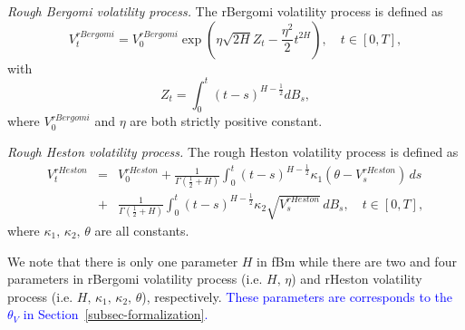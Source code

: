 \documentclass[]{article}
\renewcommand{\(}{\left(}
\renewcommand{\)}{\right)}
\begin{document}
	\textit{Rough Bergomi volatility process.} The rBergomi volatility process is defined as
	\begin{equation}
		\label{eq-rBergomi}
		V_t^{rBergomi} = V_0^{rBergomi} \exp \left(\eta\sqrt{2H}Z_t - \frac{\eta^2}{2} t^{2H}\right),\quad t\in[0,T],
	\end{equation}
	with
	\begin{equation}
		\label{eq-fBm2}
		Z_t = \int_{0}^{t} (t-s)^{H-\frac{1}{2}} dB_s,
	\end{equation}
	where $V_0^{rBergomi}$ and $\eta$ are both strictly positive constant.
	
	\textit{Rough Heston volatility process.} The rough Heston volatility process is defined as
	\begin{eqnarray}
		\label{eq-rHeston}
		V_t^{rHeston} &=& V_0^{rHeston} + \frac{1}{\Gamma\(\frac{1}{2}+H\)}\int_0^t(t-s)^{H-\frac{1}{2}} \kappa_1 (\theta-V_s^{rHeston})\,ds \nonumber\\
		&+& \frac{1}{\Gamma\(\frac{1}{2}+H\)}\int_0^t\(t-s\)^{H-\frac{1}{2}} \kappa_2 \sqrt{V_s^{rHeston}}\,dB_s,\quad t\in[0,T],
	\end{eqnarray}
	where $\kappa_1,\,\kappa_2,\,\theta$ are all constants.
	
	We note that there is only one parameter $H$ in fBm while there are two and four parameters in rBergomi volatility process (i.e. $H,\,\eta$) and rHeston volatility process (i.e. $H,\,\kappa_1,\,\kappa_2,\,\theta$), respectively. \textcolor{blue}{These parameters are corresponds to the $\theta_V$ in Section~\ref{subsec-formalization}.}
	
\end{document}
